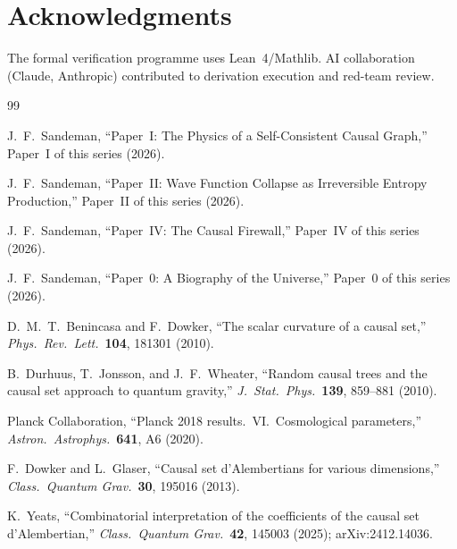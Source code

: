\documentclass[11pt,a4paper]{article}
\theoremstyle{plain}
\theoremstyle{definition}
\theoremstyle{remark}
\begin{document}
\section*{Acknowledgments}

The formal verification programme uses Lean~4/Mathlib.  AI collaboration (Claude,
Anthropic) contributed to derivation execution and red-team review.

\begin{thebibliography}{99}

J.~F.~Sandeman,
``Paper~I: The Physics of a Self-Consistent Causal Graph,''
Paper~I of this series (2026).

J.~F.~Sandeman,
``Paper~II: Wave Function Collapse as Irreversible Entropy Production,''
Paper~II of this series (2026).

J.~F.~Sandeman,
``Paper~IV: The Causal Firewall,''
Paper~IV of this series (2026).

J.~F.~Sandeman,
``Paper~0: A Biography of the Universe,''
Paper~0 of this series (2026).

D.~M.~T.~Benincasa and F.~Dowker,
``The scalar curvature of a causal set,''
\textit{Phys.\ Rev.\ Lett.}\ \textbf{104}, 181301 (2010).

B.~Durhuus, T.~Jonsson, and J.~F.~Wheater,
``Random causal trees and the causal set approach to quantum gravity,''
\textit{J.\ Stat.\ Phys.}\ \textbf{139}, 859--881 (2010).

Planck Collaboration,
``Planck 2018 results.\ VI.\ Cosmological parameters,''
\textit{Astron.\ Astrophys.}\ \textbf{641}, A6 (2020).

F.~Dowker and L.~Glaser,
``Causal set d'Alembertians for various dimensions,''
\textit{Class.\ Quantum Grav.}\ \textbf{30}, 195016 (2013).

K.~Yeats,
``Combinatorial interpretation of the coefficients of the causal set
d'Alembertian,''
\textit{Class.\ Quantum Grav.}\ \textbf{42}, 145003 (2025);
arXiv:2412.14036.

\end{thebibliography}
\end{document}
